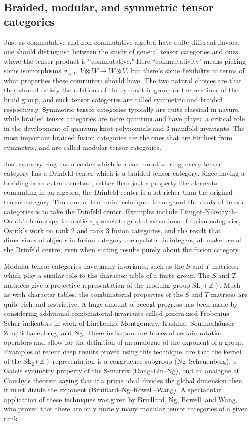 \documentclass[12pt]{article}
\begin{document}
\subsection{Braided, modular, and symmetric tensor categories}
Just as  commutative and non-commutative algebra have quite different flavors, one should distinguish between the study of general tensor categories and ones where the tensor product is ``commutative." Here ``commutativity" means picking some isomorphisms $\sigma_{V,W}: V \otimes W \rightarrow W \otimes V$, but there's some flexibility in terms of what properties these commutors should have. The two natural choices are that they should satisfy the relations of the symmetric group or the relations of the braid group, and such tensor categories are called symmetric and braided respectively. Symmetric tensor categories typically are quite classical in nature, while braided tensor categories are more quantum and have played a critical role in the development of quantum knot polynomials and 3-manifold invariants. The most important braided fusion categories are the ones that are furthest from symmetric, and are called modular tensor categories.

Just as every ring has a center which is a commutative ring, every tensor category has a Drinfeld center which is a braided tensor category. Since having a braiding is an extra structure, rather than just a property like elements commuting in an algebra, the Drinfeld center is a lot richer than the original tensor category. Thus one of the main techniques throughout the study of tensor  categories is to take the Drinfeld center.  Examples include Etingof--Nikschych--Ostrik's homotopy theoretic approach to graded extensions of fusion categories, Ostrik's work on rank 2 and rank 3 fusion categories, and the result that dimensions of objects in fusion category are cyclotomic integers; all make use of the Drinfeld centre, even when stating results purely about the fusion category.

Modular tensor categories have many invariants, such as the $S$ and $T$ matrices, which play a similar role to the character table of a finite group. The $S$ and $T$ matrices give a projective representation of the modular group $\mathrm{SL}_2(\mathbb{Z})$.  Much as with character tables, the combinatorial properties of the $S$ and $T$ matrices are quite rich and restrictive. A huge amount of recent progress has been made by considering additional combinatorial invariants called generalized Frobenius--Schur indicators in work of Linchenko, Montgomery, Kashina, Sommerh\"auser, Zhu, Schauenberg, and Ng. These indicators are traces of certain rotation operators and allow for the definition of an analogue of the exponent of a group. Examples of recent deep results proved using this technique, are that the kernel of the $\mathrm{SL}_2(\mathbb{Z})$ representation is a congruence subgroup (Ng--Schauenberg), a Galois symmetry property of the S-matrix (Dong--Lin--Ng), and an analogue of Cauchy's theorem saying that if a prime ideal divides the global dimension then it must divide the exponent (Bruillard--Ng--Rowell--Wang). A spectacular application of these techniques was given by Bruillard, Ng, Rowell, and Wang, who proved that there are only finitely many modular tensor categories of a given rank.
\end{document}
